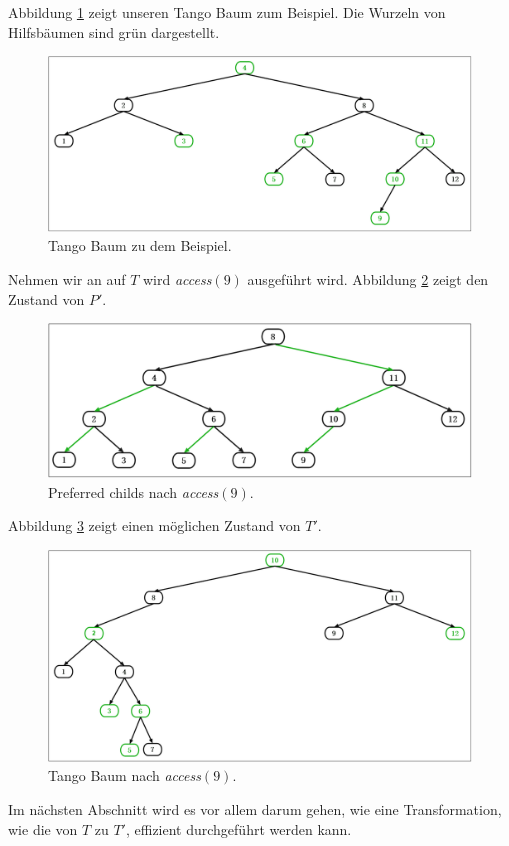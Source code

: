 \documentclass[a4paper,12pt]{article}
\begin{document}
\noindent Abbildung \ref{fig:Tangobaum} zeigt unseren Tango Baum zum Beispiel. Die Wurzeln von Hilfsbäumen sind grün dargestellt.

\begin{figure}[H]
	\centering
	\includegraphics[width=1\textwidth]{"Medien/Tango/Tangobaum"}
	\caption{Tango Baum zu dem Beispiel. }
	\label{fig:Tangobaum}
\end{figure}
\noindent Nehmen wir an auf $T$ wird \textit{access}$\left(9\right)$ ausgeführt wird. Abbildung \ref{fig:prefChilds2} zeigt den Zustand von $P'$.

\begin{figure}[H]
	\centering
	\includegraphics[width=1\textwidth]{"Medien/Tango/prefChilds2"}
	\caption{Preferred childs nach  \textit{access}$\left(9\right)$. }
	\label{fig:prefChilds2}
\end{figure}

\noindent Abbildung \ref{fig:Tangobaum2} zeigt einen möglichen Zustand von $T'$.
\begin{figure}[H]
	\centering
	\includegraphics[width=1\textwidth]{"Medien/Tango/Tangobaum2"}
	\caption{Tango Baum nach  \textit{access}$\left(9\right)$. }
	\label{fig:Tangobaum2}
\end{figure}
\noindent Im nächsten Abschnitt wird es vor allem darum gehen, wie eine Transformation, wie die von $T$ zu $T'$, effizient durchgeführt werden kann.
\end{document}
